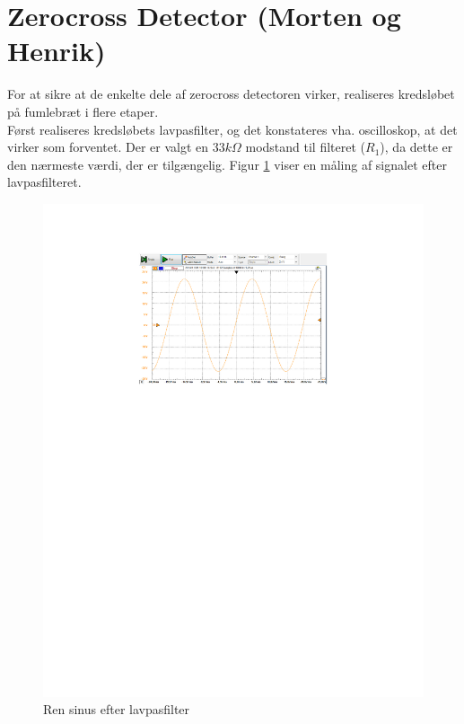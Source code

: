 \section{Zerocross Detector (Morten og Henrik)}

For at sikre at de enkelte dele af zerocross detectoren virker, realiseres kredsløbet på fumlebræt i flere etaper.\\ 
Først realiseres kredsløbets lavpasfilter, og det konstateres vha. oscilloskop, at det virker som forventet. Der er valgt en $33 k\Omega$ modstand til filteret ($R_{1}$), da dette er den nærmeste værdi, der er tilgængelig. Figur \ref{fig:ZC_Lavpasfilter} viser en måling af signalet efter lavpasfilteret.\\	

\begin{figure}[h]
	\centering
	\includegraphics[width={\textwidth},trim=150 500 145 80, clip=true]{../Implementering/billeder/lavpasfilter.pdf}
	\caption{Ren sinus efter lavpasfilter}
	\label{fig:ZC_Lavpasfilter}
\end{figure}

